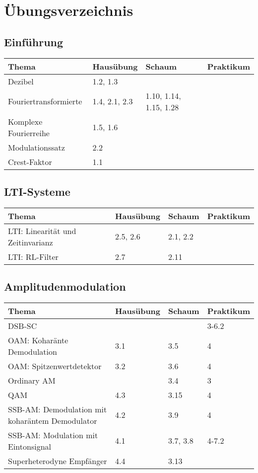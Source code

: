 \section{Übungsverzeichnis}

\subsection{Einführung}
	\begin{tabular}{|p{9cm}|p{2.5cm}|p{3.5cm}|p{2cm}|}
	\hline
	\textbf{Thema} & \textbf{Hausübung} & \textbf{Schaum} & \textbf{Praktikum} \\
	\hline
	Dezibel & 1.2, 1.3 &  &  \\
	\hline
	Fouriertransformierte & 1.4, 2.1, 2.3 & 1.10, 1.14, 1.15, 1.28 &  \\
	\hline
	Komplexe Fourierreihe & 1.5, 1.6 & & \\
	\hline
	Modulationssatz & 2.2 & & \\
	\hline
	Crest-Faktor & 1.1 & & \\
	\hline
	\end{tabular}

\subsection{LTI-Systeme}
	\begin{tabular}{|p{9cm}|p{2.5cm}|p{3.5cm}|p{2cm}|}
	\hline
	\textbf{Thema} & \textbf{Hausübung} & \textbf{Schaum} & \textbf{Praktikum} \\ \hline
	LTI: Linearität und Zeitinvarianz & 2.5, 2.6 & 2.1, 2.2 &  \\ \hline
	LTI: RL-Filter & 2.7 & 2.11 &  \\ \hline
	\end{tabular}

\subsection{Amplitudenmodulation}
	\begin{tabular}{|p{9cm}|p{2.5cm}|p{3.5cm}|p{2cm}|}
	\hline
	\textbf{Thema} & \textbf{Hausübung} & \textbf{Schaum} & \textbf{Praktikum} \\ \hline
	DSB-SC &  &  & 3-6.2 \\ \hline
	OAM: Koharänte Demodulation & 3.1 & 3.5 & 4 \\ \hline
	OAM: Spitzenwertdetektor & 3.2 & 3.6 & 4 \\ \hline
	Ordinary AM & & 3.4 & 3 \\ \hline
	QAM & 4.3  & 3.15 & 4 \\ \hline
	SSB-AM: Demodulation mit koharäntem Demodulator & 4.2 & 3.9 & 4 \\
	\hline SSB-AM: Modulation mit Eintonsignal & 4.1 & 3.7, 3.8 & 4-7.2 \\ \hline
	Superheterodyne Empfänger & 4.4 & 3.13 & \\
	\hline
	\end{tabular}


